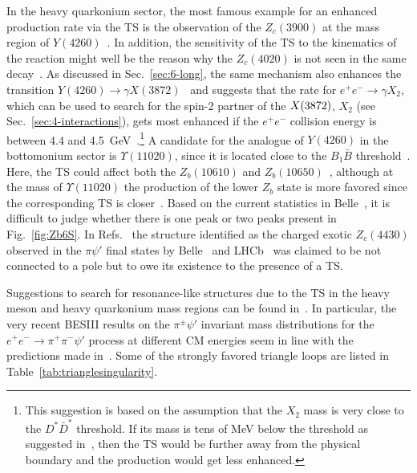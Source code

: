 In the heavy quarkonium sector,  the most famous example for an enhanced
production rate via the TS is the observation of the $Z_c(3900)$ at the mass
region of $Y(4260)$~\cite{Wang:2013cya,Wang:2013hga,Liu:2013vfa,
Szczepaniak:2015eza,Gong:2016jzb, Pilloni:2016obd}.
In addition, the sensitivity of the TS to the kinematics of the reaction might
well be the reason why the $Z_c(4020)$ is not seen in the same
decay~\cite{Wang:2013cya,Wang:2013hga}.
As discussed in Sec.~\ref{sec:6-long}, the same mechanism also enhances the
transition $Y(4260)\to \gamma X(3872)$~\cite{Guo:2013nza} and suggests that the
rate for $e^+e^-\to\gamma X_2$, which can be used to search for the spin-2
partner of the $X(3872)$, $X_2$ (see Sec.~\ref{sec:4-interactions}), gets most
enhanced if the $e^+e^-$ collision energy is between 4.4 and
4.5~GeV~\cite{Guo:2014ura}.\footnote{This suggestion is based on the assumption
that the $X_2$ mass is very close to the $D^*\bar D^*$ threshold. If its mass is
tens of MeV below the threshold as suggested in~\cite{Baru:2016iwj}, then the TS
would be further away from the physical boundary and the production would get
less enhanced. } A candidate for the analogue of $Y(4260)$ in the bottomonium
sector is $\Upsilon(11020)$, since it is located close to the $B_1\bar B$
threshold~\cite{Wang:2013hga,Bondar:2016pox}. Here, the TS could
affect both the $Z_b(10610)$ and $Z_b(10650)$~\cite{Wang:2013hga}, although at
the mass of $\Upsilon(11020)$ the production of the lower $Z_b$ state is more
favored since the corresponding TS is closer~\cite{Bondar:2016pox}.
Based on the current statistics in Belle~\cite{Bondar:2016pox}, it is difficult
to judge whether there is one peak or two peaks present in Fig.~\ref{fig:Zb6S}.
In Refs.~\cite{Pakhlov:2014qva,Uglov:2016nql} the structure identified as the
charged exotic $Z_c(4430)$ observed in the $\pi \psi'$ final states by
Belle~\cite{Mizuk:2009da,Chilikin:2013tch} and LHCb~\cite{Aaij:2015zxa} was
claimed to be not connected to a pole but to owe its existence to the presence
of a TS.

Suggestions to search for resonance-like structures due to the TS in the heavy
meson and heavy quarkonium mass regions can be found
in~\cite{Liu:2014spa,Liu:2015cah,Liu:2015taa,Liu:2017vsf}. In particular, the
very recent BESIII results on the $\pi^\pm\psi'$ invariant mass distributions
for the $e^+e^-\to \pi^+\pi^-\psi'$ process at different CM energies seem in
line with the predictions made in~\cite{Liu:2014spa}.
Some of the strongly favored triangle loops are listed in
Table~\ref{tab:trianglesingularity}.


